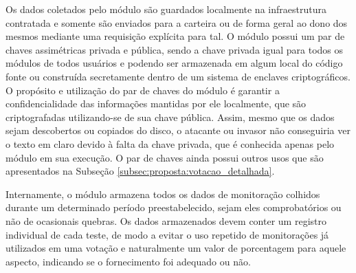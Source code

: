 %
Os dados coletados pelo módulo são guardados localmente na infraestrutura contratada e somente são enviados para a carteira ou de forma geral ao dono dos mesmos mediante uma requisição explícita para tal. O módulo possui um par de chaves assimétricas privada e pública, sendo a chave privada igual para todos os módulos de todos usuários e podendo ser armazenada em algum local do código fonte ou construída secretamente dentro de um sistema de enclaves criptográficos. O propósito e utilização do par de chaves do módulo é garantir a confidencialidade das informações mantidas por ele localmente, que são criptografadas utilizando-se de sua chave pública. Assim, mesmo que os dados sejam descobertos ou copiados do disco, o atacante ou invasor não conseguiria ver o texto em claro devido à falta da chave privada, que é conhecida apenas pelo módulo em sua execução. O par de chaves ainda possui outros usos que são apresentados na Subseção \ref{subsec:proposta:votacao_detalhada}.


%
Internamente, o módulo armazena todos os dados de monitoração colhidos durante um determinado período preestabelecido, sejam eles comprobatórios ou não de ocasionais quebras. Os dados armazenados devem conter um registro individual de cada teste, de modo a evitar o uso repetido de monitorações já utilizados em uma votação e naturalmente um valor de porcentagem para aquele aspecto, indicando se o fornecimento foi adequado ou não.


